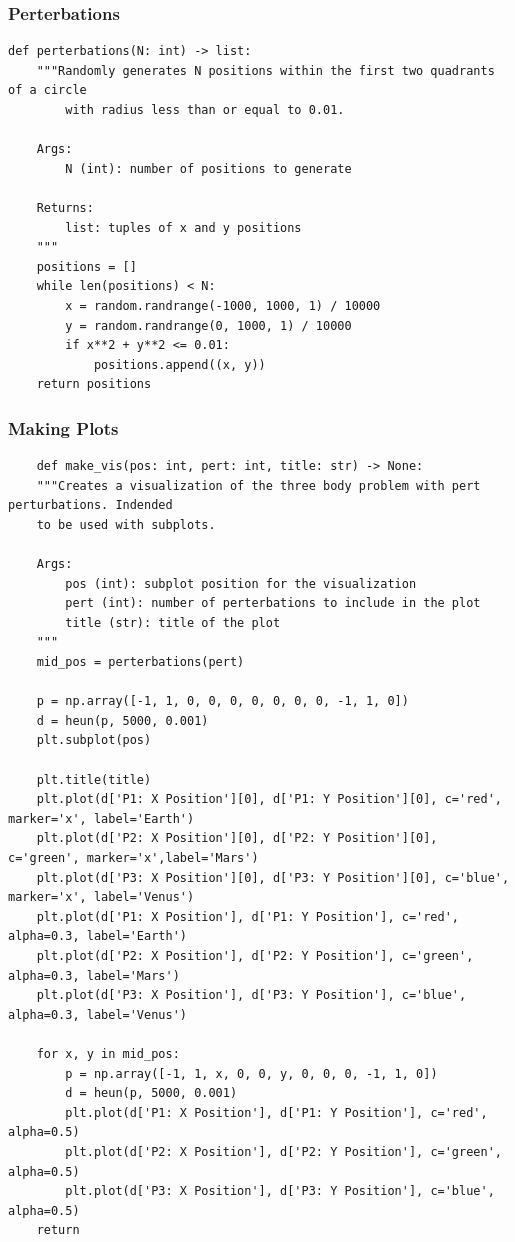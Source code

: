 \documentclass{article}
\begin{document}
\subsubsection{Perterbations}
\begin{verbatim}
def perterbations(N: int) -> list:
    """Randomly generates N positions within the first two quadrants of a circle 
        with radius less than or equal to 0.01.

    Args:
        N (int): number of positions to generate

    Returns:
        list: tuples of x and y positions
    """
    positions = []
    while len(positions) < N:
        x = random.randrange(-1000, 1000, 1) / 10000
        y = random.randrange(0, 1000, 1) / 10000
        if x**2 + y**2 <= 0.01:
            positions.append((x, y))
    return positions
\end{verbatim}

\subsubsection{Making Plots}
\begin{verbatim}
    def make_vis(pos: int, pert: int, title: str) -> None:
    """Creates a visualization of the three body problem with pert perturbations. Indended 
    to be used with subplots.

    Args:
        pos (int): subplot position for the visualization
        pert (int): number of perterbations to include in the plot
        title (str): title of the plot
    """
    mid_pos = perterbations(pert)

    p = np.array([-1, 1, 0, 0, 0, 0, 0, 0, 0, -1, 1, 0])
    d = heun(p, 5000, 0.001)
    plt.subplot(pos)

    plt.title(title)
    plt.plot(d['P1: X Position'][0], d['P1: Y Position'][0], c='red', marker='x', label='Earth')
    plt.plot(d['P2: X Position'][0], d['P2: Y Position'][0], c='green', marker='x',label='Mars')
    plt.plot(d['P3: X Position'][0], d['P3: Y Position'][0], c='blue', marker='x', label='Venus')
    plt.plot(d['P1: X Position'], d['P1: Y Position'], c='red', alpha=0.3, label='Earth')
    plt.plot(d['P2: X Position'], d['P2: Y Position'], c='green', alpha=0.3, label='Mars')
    plt.plot(d['P3: X Position'], d['P3: Y Position'], c='blue', alpha=0.3, label='Venus')

    for x, y in mid_pos:
        p = np.array([-1, 1, x, 0, 0, y, 0, 0, 0, -1, 1, 0])
        d = heun(p, 5000, 0.001)        
        plt.plot(d['P1: X Position'], d['P1: Y Position'], c='red', alpha=0.5)
        plt.plot(d['P2: X Position'], d['P2: Y Position'], c='green', alpha=0.5)
        plt.plot(d['P3: X Position'], d['P3: Y Position'], c='blue', alpha=0.5)
    return
\end{verbatim}
\end{document}
